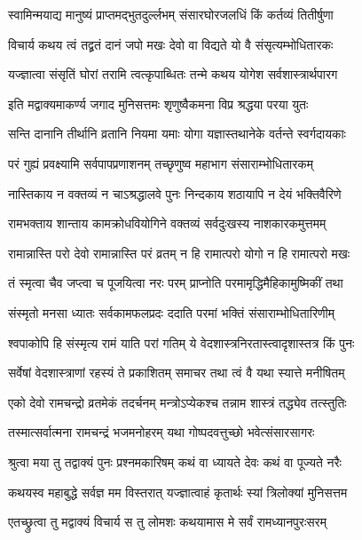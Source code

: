 \twolineshloka
{स्वामिन्मयाद्य मानुष्यं प्राप्तमद्भुतदुर्ल्लभम्}
{संसारघोरजलधिं किं कर्तव्यं तितीर्षुणा}%

\twolineshloka
{विचार्य कथय त्वं तद्व्रतं दानं जपो मखः}
{देवो वा विद्यते यो वै संसृत्यम्भोधितारकः}%

\twolineshloka
{यज्ज्ञात्वा संसृतिं घोरां तरामि त्वत्कृपाब्धितः}
{तन्मे कथय योगेश सर्वशास्त्रार्थपारग}%

\twolineshloka
{इति मद्वाक्यमाकर्ण्य जगाद मुनिसत्तमः}
{शृणुष्वैकमना विप्र श्रद्धया परया युतः}%

\twolineshloka
{सन्ति दानानि तीर्थानि व्रतानि नियमा यमाः}
{योगा यज्ञास्तथानेके वर्तन्ते स्वर्गदायकाः}%

\twolineshloka
{परं गुह्यं प्रवक्ष्यामि सर्वपापप्रणाशनम्}
{तच्छृणुष्व महाभाग संसाराम्भोधितारकम्}%

\twolineshloka
{नास्तिकाय न वक्तव्यं न चाऽश्रद्धालवे पुनः}
{निन्दकाय शठायापि न देयं भक्तिवैरिणे}%

\twolineshloka
{रामभक्ताय शान्ताय कामक्रोधवियोगिने}
{वक्तव्यं सर्वदुःखस्य नाशकारकमुत्तमम्}%

\twolineshloka
{रामान्नास्ति परो देवो रामान्नास्ति परं व्रतम्}
{न हि रामात्परो योगो न हि रामात्परो मखः}%

\twolineshloka
{तं स्मृत्वा चैव जप्त्वा च पूजयित्वा नरः परम्}
{प्राप्नोति परमामृद्धिमैहिकामुष्मिकीं तथा}%

\twolineshloka
{संस्मृतो मनसा ध्यातः सर्वकामफलप्रदः}
{ददाति परमां भक्तिं संसाराम्भोधितारिणीम्}%

\twolineshloka
{श्वपाकोपि हि संस्मृत्य रामं याति परां गतिम्}
{ये वेदशास्त्रनिरतास्त्वादृशास्तत्र किं पुनः}%

\twolineshloka
{सर्वेषां वेदशास्त्राणां रहस्यं ते प्रकाशितम्}
{समाचर तथा त्वं वै यथा स्यात्ते मनीषितम्}%

\twolineshloka
{एको देवो रामचन्द्रो व्रतमेकं तदर्चनम्}
{मन्त्रोऽप्येकश्च तन्नाम शास्त्रं तद्ध्येव तत्स्तुतिः}%

\twolineshloka
{तस्मात्सर्वात्मना रामचन्द्रं भजमनोहरम्}
{यथा गोष्पदवत्तुच्छो भवेत्संसारसागरः}%

\twolineshloka
{श्रुत्वा मया तु तद्वाक्यं पुनः प्रश्नमकारिषम्}
{कथं वा ध्यायते देवः कथं वा पूज्यते नरैः}%

\twolineshloka
{कथयस्व महाबुद्धे सर्वज्ञ मम विस्तरात्}
{यज्ज्ञात्वाहं कृतार्थः स्यां त्रिलोक्यां मुनिसत्तम}%

\twolineshloka
{एतच्छ्रुत्वा तु मद्वाक्यं विचार्य स तु लोमशः}
{कथयामास मे सर्वं रामध्यानपुरःसरम्}%

